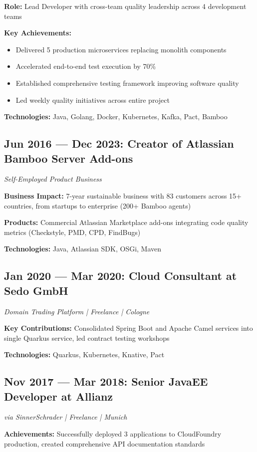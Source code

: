 \documentclass[10pt,a4paper]{article}
\newenvironment{compactlist}{\begin{itemize}[leftmargin=1em,itemsep=0pt,parsep=0pt,topsep=0pt,partopsep=0pt]}{\end{itemize}}
\begin{document}
\textbf{Role:} Lead Developer with cross-team quality leadership across 4 development teams

\textbf{Key Achievements:}
\begin{compactlist}
\item Delivered 5 production microservices replacing monolith components
\item Accelerated end-to-end test execution by 70\%
\item Established comprehensive testing framework improving software quality
\item Led weekly quality initiatives across entire project
\end{compactlist}

\textbf{Technologies:} Java, Golang, Docker, Kubernetes, Kafka, Pact, Bamboo

\subsection{Jun 2016 — Dec 2023: Creator of Atlassian Bamboo Server Add-ons}
\textit{Self-Employed Product Business}

\textbf{Business Impact:} 7-year sustainable business with 83 customers across 15+ countries, from startups to enterprise (200+ Bamboo agents)

\textbf{Products:} Commercial Atlassian Marketplace add-ons integrating code quality metrics (Checkstyle, PMD, CPD, FindBugs)

\textbf{Technologies:} Java, Atlassian SDK, OSGi, Maven

\subsection{Jan 2020 — Mar 2020: Cloud Consultant at Sedo GmbH}
\textit{Domain Trading Platform | Freelance | Cologne}

\textbf{Key Contributions:} Consolidated Spring Boot and Apache Camel services into single Quarkus service, led contract testing workshops

\textbf{Technologies:} Quarkus, Kubernetes, Knative, Pact

\subsection{Nov 2017 — Mar 2018: Senior JavaEE Developer at Allianz}
\textit{via SinnerSchrader | Freelance | Munich}

\textbf{Achievements:} Successfully deployed 3 applications to CloudFoundry production, created comprehensive API documentation standards
\end{document}
